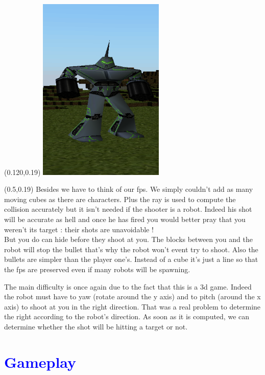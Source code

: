 \documentclass[article]{report}         %
\begin{document}
   \begin{textblock}{0.6}(0.120,0.19)
    \includegraphics[width=6cm]{images/Physics/RobotShoot.png}
    \end{textblock}

\begin{textblock}{0.4}(0.5,0.19)
Besides we have to think of our fps. We simply couldn't add as many moving cubes as there are characters. Plus the ray is used to compute the collision accurately but it isn't needed if the shooter is a robot. Indeed his shot will be accurate as hell and once he has fired you would better pray that you weren't its target : their shots are unavoidable !\\

But you do can hide before they shoot at you. The blocks between you and the robot will stop the bullet that's why the robot won't event try to shoot. 
Also the bullets are simpler than the player one's. Instead of a cube it's just a line so that the fps are preserved even if many robots will be spawning. 
    \end{textblock}
\bigskip\bigskip\bigskip\bigskip\bigskip\bigskip\bigskip\bigskip\bigskip\bigskip\bigskip\bigskip\bigskip\bigskip\bigskip\bigskip\bigskip
\bigskip\bigskip\bigskip\bigskip\bigskip\bigskip\bigskip\bigskip
The main difficulty is once again due to the fact that this is a 3d game. Indeed the robot must have to yaw (rotate around the y axis) and to pitch (around the x axis) to shoot at you in the right direction. That was a real problem to determine the right according to the robot's direction. As soon as it is computed, we can determine whether the shot will be hitting a target or not.

    \chapter{\textcolor{blue}{Gameplay}}
\end{document}

